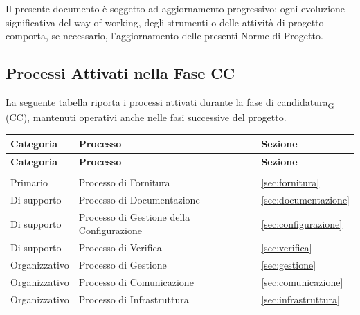 Il presente documento è soggetto ad aggiornamento progressivo: ogni evoluzione
significativa del way of working, degli strumenti o delle attività
di progetto comporta, se necessario, l'aggiornamento delle presenti Norme di
Progetto.


\subsection{Processi Attivati nella Fase CC}

La seguente tabella riporta i processi attivati durante la fase di
candidatura\textsubscript{G} (CC), mantenuti operativi anche nelle fasi successive
del progetto.

\bigskip

\begin{xltabular}{\textwidth}{
    >{\raggedright\arraybackslash}p{3cm}
    >{\raggedright\arraybackslash}X
    >{\raggedright\arraybackslash}p{3cm}
}
    \toprule
    \textbf{Categoria} & \textbf{Processo} & \textbf{Sezione} \\
    \midrule
    \endfirsthead

    \toprule
    \textbf{Categoria} & \textbf{Processo} & \textbf{Sezione} \\
    \midrule
    \endhead

    \midrule
     \\
    \endfoot

    \bottomrule
    \endlastfoot

    Primario
    & Processo di Fornitura
    & \ref{sec:fornitura} \\

    Di supporto
    & Processo di Documentazione
    & \ref{sec:documentazione} \\

    Di supporto
    & Processo di Gestione della Configurazione
    & \ref{sec:configurazione} \\

    Di supporto
    & Processo di Verifica
    & \ref{sec:verifica} \\

    Organizzativo
    & Processo di Gestione
    & \ref{sec:gestione} \\

    Organizzativo
    & Processo di Comunicazione
    & \ref{sec:comunicazione} \\

    Organizzativo
    & Processo di Infrastruttura
    & \ref{sec:infrastruttura} \\

\end{xltabular}


